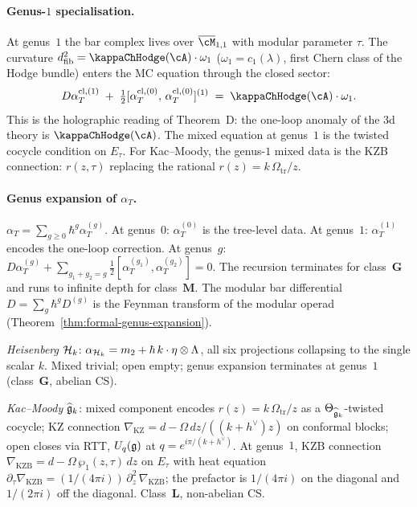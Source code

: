 \paragraph{Genus-$1$ specialisation.}
At genus~$1$ the bar complex lives over $\overline{\cM}_{1,1}$
with modular parameter $\tau$. The curvature
$d_{\mathrm{fib}}^2 = \kappaChHodge(\cA)\cdot\omega_1$
($\omega_1 = c_1(\lambda)$, first Chern class of the Hodge
bundle) enters the MC equation through the closed sector:
\[
D\alpha_T^{\mathrm{cl},(1)}
\;+\;
\tfrac{1}{2}[\alpha_T^{\mathrm{cl},(0)},\,
\alpha_T^{\mathrm{cl},(0)}]^{(1)}
\;=\;
\kappaChHodge(\cA) \cdot \omega_1.
\]
This is the holographic reading of Theorem~D: the one-loop
anomaly of the 3d theory is $\kappaChHodge(\cA)$. The
mixed equation at genus~$1$ is the twisted cocycle condition on
$E_\tau$. For Kac--Moody, the genus-$1$ mixed data is the KZB
connection: $r(z,\tau)$ replacing the rational
$r(z) = k\,\Omega_{\mathrm{tr}}/z$.

\paragraph{Genus expansion of $\alpha_T$.}
$\alpha_T = \sum_{g \ge 0} \hbar^g \alpha_T^{(g)}$. At genus~$0$:
$\alpha_T^{(0)}$ is the tree-level data. At genus~$1$:
$\alpha_T^{(1)}$ encodes the one-loop correction. At genus~$g$:
$D\alpha_T^{(g)} + \sum_{g_1 + g_2 = g}
\tfrac{1}{2}[\alpha_T^{(g_1)}, \alpha_T^{(g_2)}] = 0$.
The recursion terminates for class~$\mathbf{G}$ and runs to
infinite depth for class~$\mathbf{M}$. The modular bar
differential $D = \sum_g \hbar^g D^{(g)}$ is the Feynman
transform of the modular operad
(Theorem~\ref{thm:formal-genus-expansion}).

\smallskip\emph{Heisenberg} $\mathcal{H}_k$:
$\alpha_{\mathcal{H}_k} = m_2 + \hbar\,k\cdot\eta\otimes\Lambda$, all
six projections collapsing to the single scalar $k$. Mixed
trivial; open empty; genus expansion terminates at genus~$1$
(class~$\mathbf{G}$, abelian CS).

\smallskip\emph{Kac--Moody} $\widehat{\mathfrak{g}}_k$:
mixed component encodes $r(z) = k\,\Omega_{\mathrm{tr}}/z$ as a
$\Theta_{\widehat{\mathfrak{g}}_k}$-twisted cocycle; KZ connection
$\nabla_{\mathrm{KZ}} = d - \Omega\,dz/((k+h^\vee)z)$ on
conformal blocks; open closes via RTT,
$U_q(\mathfrak{g})$ at $q = e^{i\pi/(k+h^\vee)}$. At genus~$1$,
KZB connection $\nabla_{\mathrm{KZB}} = d - \Omega\,\wp_1(z,\tau)\,dz$
on $E_\tau$ with heat equation
$\partial_\tau \nabla_{\mathrm{KZB}} =
(1/(4\pi i))\,\partial_z^2\,\nabla_{\mathrm{KZB}}$; the prefactor
is $1/(4\pi i)$ on the diagonal and $1/(2\pi i)$ off the diagonal.
Class~$\mathbf{L}$, non-abelian CS.

